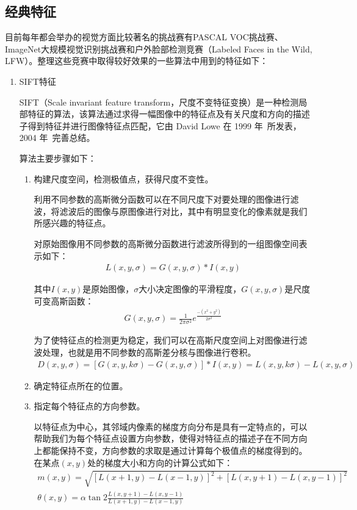 \subsection{经典特征}
\label{2.3.2}

目前每年都会举办的视觉方面比较著名的挑战赛有PASCAL VOC挑战赛、ImageNet大规模视觉识别挑战赛和户外脸部检测竞赛（Labeled Faces in the Wild, LFW）。整理这些竞赛中取得较好效果的一些算法中用到的特征如下：
\begin{enumerate}
\item SIFT特征

SIFT（Scale invariant feature transform，尺度不变特征变换）是一种检测局部特征的算法，该算法通过求得一幅图像中的特征点及有关尺度和方向的描述子得到特征并进行图像特征点匹配，它由 David Lowe 在 1999 年~\cite{lowe1999object}所发表，2004 年~\cite{lowe2004distinctive}完善总结。

算法主要步骤如下：

\begin{enumerate}
\item 构建尺度空间，检测极值点，获得尺度不变性。

利用不同参数的高斯微分函数可以在不同尺度下对要处理的图像进行滤波，将滤波后的图像与原图像进行对比，其中有明显变化的像素就是我们所感兴趣的特征点。
    
对原始图像用不同参数的高斯微分函数进行滤波所得到的一组图像空间表示如下：
\begin{align}
L(x,y,\sigma)=G(x,y,\sigma)*I(x,y)
\end{align}
    
其中$I(x,y)$是原始图像，$\sigma$大小决定图像的平滑程度，$G(x,y,\sigma)$是尺度可变高斯函数：
\begin{align}
G(x,y,\sigma)=\frac{1}{2\pi \sigma^{2}}e^{\frac{-(x^{2}+y^{2})}{2\sigma^{2}}}
\end{align}

为了使特征点的检测更为稳定，我们可以在高斯尺度空间上对图像进行滤波处理，也就是用不同参数的高斯差分核与图像进行卷积。
\begin{align}
D(x,y,\sigma)=[G(x,y,k\sigma)-G(x,y,\sigma)]*I(x,y)=L(x,y,k\sigma)-L(x,y,\sigma)
\end{align}
    
\item 确定特征点所在的位置。

\item 指定每个特征点的方向参数。

以特征点为中心，其邻域内像素的梯度方向分布是具有一定特点的，可以帮助我们为每个特征点设置方向参数，使得对特征点的描述子在不同方向上都能保持不变，方向参数的求取是通过计算每个极值点的梯度得到的。在某点$(x, y)$处的梯度大小和方向的计算公式如下：
\begin{align}
m(x,y)=\sqrt{[L(x+1,y)-L(x-1,y)]^{2}+[L(x,y+1)-L(x,y-1)]^{2}}\\
\theta(x,y)=\alpha\tan2\frac{L(x,y+1)-L(x,y-1)}{L(x+1,y)-L(x-1,y)}
\end{align}


\end{enumerate}
\end{enumerate}
